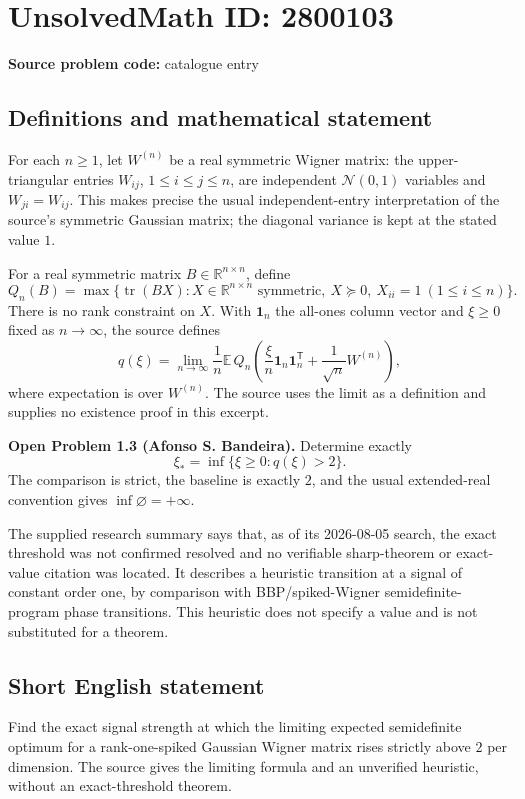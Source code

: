 \documentclass[11pt]{article}
\newcommand{\R}{\mathbb{R}}
\newcommand{\E}{\mathbb{E}}
\begin{document}
\section*{UnsolvedMath ID: 2800103}
\textbf{Source problem code:} catalogue entry
\subsection{Definitions and mathematical statement}
For each $n\geq1$, let $W^{(n)}$ be a real symmetric Wigner matrix: the upper-triangular entries $W_{ij}$, $1\leq i\leq j\leq n$, are independent $\mathcal N(0,1)$ variables and $W_{ji}=W_{ij}$. This makes precise the usual independent-entry interpretation of the source's symmetric Gaussian matrix; the diagonal variance is kept at the stated value $1$.

For a real symmetric matrix $B\in\R^{n\times n}$, define
\[
 Q_n(B)=\max\{\operatorname{tr}(BX):X\in\R^{n\times n}\text{ symmetric},\ X\succeq0,\ X_{ii}=1\ (1\leq i\leq n)\}.
\]
There is no rank constraint on $X$. With $\mathbf1_n$ the all-ones column vector and $\xi\geq0$ fixed as $n\to\infty$, the source defines
\[
 q(\xi)=\lim_{n\to\infty}\frac1n\E\,Q_n\left(
 \frac\xi n\mathbf1_n\mathbf1_n^{\mathsf T}+\frac1{\sqrt n}W^{(n)}\right),
\]
where expectation is over $W^{(n)}$. The source uses the limit as a definition and supplies no existence proof in this excerpt.

\textbf{Open Problem 1.3 (Afonso S. Bandeira).} Determine exactly
\[
 \xi_* =\inf\{\xi\geq0:q(\xi)>2\}.
\]
The comparison is strict, the baseline is exactly $2$, and the usual extended-real convention gives $\inf\varnothing=+\infty$.

The supplied research summary says that, as of its 2026-08-05 search, the exact threshold was not confirmed resolved and no verifiable sharp-theorem or exact-value citation was located. It describes a heuristic transition at a signal of constant order one, by comparison with BBP/spiked-Wigner semidefinite-program phase transitions. This heuristic does not specify a value and is not substituted for a theorem.
\subsection{Short English statement}
Find the exact signal strength at which the limiting expected semidefinite optimum for a rank-one-spiked Gaussian Wigner matrix rises strictly above $2$ per dimension. The source gives the limiting formula and an unverified heuristic, without an exact-threshold theorem.
\end{document}
